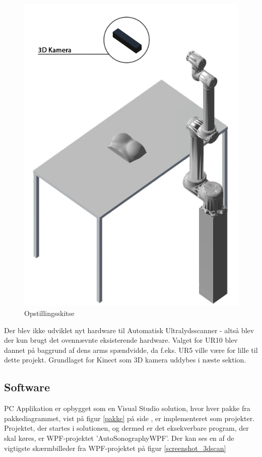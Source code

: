 \begin{figure}[H]
\begin{minipage}{0.4\textwidth}
    \includegraphics[width=\textwidth]{figurer/3d_setup}
    \caption{Opstillingsskitse}
    \label{3dsetup}
  \end{minipage}
\end{figure}

Der blev ikke udviklet nyt hardware til Automatisk Ultralydsscanner - altså blev der kun brugt det ovennævnte eksisterende hardware. Valget for UR10 blev dannet på baggrund af dens arms spændvidde, da f.eks. UR5 ville være for lille til dette projekt. Grundlaget for Kinect som 3D kamera uddybes i næste sektion.

\subsection{Software}
PC Applikation er opbygget som en Visual Studio solution, hvor hver pakke fra pakkediagrammet, vist på figur \ref{pakke} på side \pageref{pakke}, er implementeret som projekter. Projektet, der startes i solutionen, og dermed er det eksekverbare program, der skal køres, er WPF-projektet 'AutoSonographyWPF'. Der kan ses en af de vigtigste skærmbilleder fra WPF-projektet på figur \ref{screenshot_3dscan} \newline

